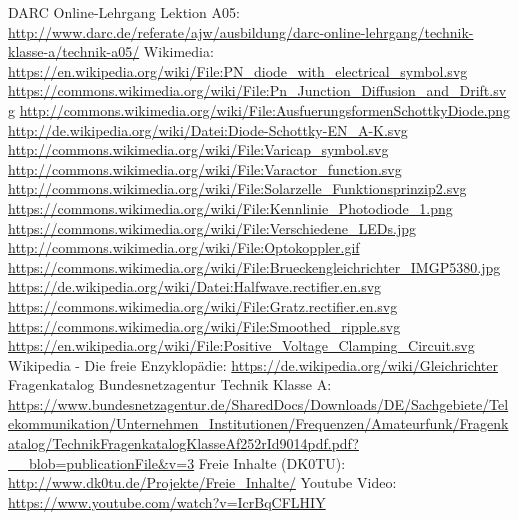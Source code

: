 \begin{thebibliography}{}
      DARC Online-Lehrgang Lektion A05:
                    \url{http://www.darc.de/referate/ajw/ausbildung/darc-online-lehrgang/technik-klasse-a/technik-a05/}
     	Wikimedia:
                    \url{https://en.wikipedia.org/wiki/File:PN_diode_with_electrical_symbol.svg}
                    \url{https://commons.wikimedia.org/wiki/File:Pn_Junction_Diffusion_and_Drift.svg}
                    \url{http://commons.wikimedia.org/wiki/File:AusfuerungsformenSchottkyDiode.png}
                    \url{http://de.wikipedia.org/wiki/Datei:Diode-Schottky-EN_A-K.svg}
                    \url{http://commons.wikimedia.org/wiki/File:Varicap_symbol.svg}
                    \url{http://commons.wikimedia.org/wiki/File:Varactor_function.svg}
                    \url{http://commons.wikimedia.org/wiki/File:Solarzelle_Funktionsprinzip2.svg}
                    \url{https://commons.wikimedia.org/wiki/File:Kennlinie_Photodiode_1.png}
                    \url{https://commons.wikimedia.org/wiki/File:Verschiedene_LEDs.jpg}
                    \url{http://commons.wikimedia.org/wiki/File:Optokoppler.gif}
                    \url{https://commons.wikimedia.org/wiki/File:Brueckengleichrichter_IMGP5380.jpg}
                    \url{https://de.wikipedia.org/wiki/Datei:Halfwave.rectifier.en.svg}
                    \url{https://commons.wikimedia.org/wiki/File:Gratz.rectifier.en.svg}
                    \url{https://commons.wikimedia.org/wiki/File:Smoothed_ripple.svg}
                    \url{https://en.wikipedia.org/wiki/File:Positive_Voltage_Clamping_Circuit.svg}
                    \url{}
                    \url{}
        Wikipedia - Die freie Enzyklopädie:
                    \url{https://de.wikipedia.org/wiki/Gleichrichter}
	   Fragenkatalog Bundesnetzagentur Technik Klasse A:                   
                    \url{https://www.bundesnetzagentur.de/SharedDocs/Downloads/DE/Sachgebiete/Telekommunikation/Unternehmen_Institutionen/Frequenzen/Amateurfunk/Fragenkatalog/TechnikFragenkatalogKlasseAf252rId9014pdf.pdf?__blob=publicationFile&v=3}
        Freie Inhalte (DK0TU):
                    \url{http://www.dk0tu.de/Projekte/Freie_Inhalte/}
         Youtube Video:                   
                    \url{https://www.youtube.com/watch?v=IcrBqCFLHIY}
\end{thebibliography} 



